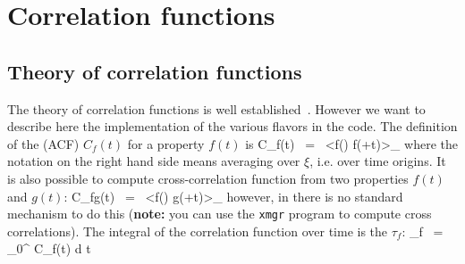 \section{Correlation functions}
\label{sec:corr}

\subsection{Theory of correlation functions}
The theory of correlation functions is well established~\cite{Allen87}.
However we want to describe here the implementation of the various 
 flavors in the {\gromacs} code.
The definition of the  (ACF)
$C_f(t)$ for a property $f(t)$ is
\beq
C_f(t)	~=~	\left<f(\xi) f(\xi+t)\right>_{\xi}
\label{eqn:corr}
\eeq
where the notation on the right hand side means averaging over $\xi$, i.e. over
time origins.
It is also possible to compute cross-correlation function from two properties
$f(t)$ and $g(t)$:
\beq
C_{fg}(t) ~=~ 	\left<f(\xi) g(\xi+t)\right>_{\xi}
\eeq
however, in {\gromacs} there is no standard mechanism to do this
({\bf note:} you can use the {\tt xmgr} program to compute cross correlations).
The integral of the correlation function over time is the 
 $\tau_f$:
\beq
\tau_f	~=~	\int_0^{\infty} C_f(t) {\rm d} t
\label{eqn:corrtime}
\eeq

